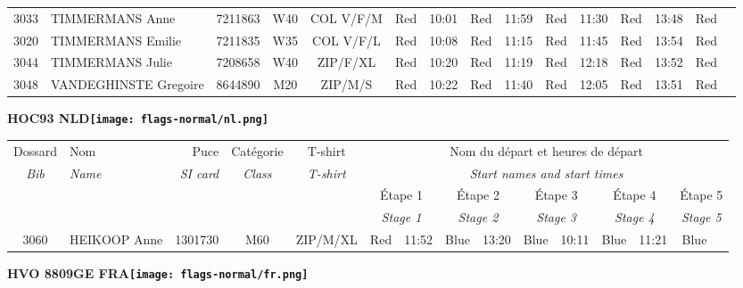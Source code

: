 \documentclass{report}
\begin{document}
\begin{longtable}{|c|l|r|c|c|*{5}{cc|}}
    3033 & TIMMERMANS Anne & 7211863 & W40 & COL V/F/M & Red & 10:01 & Red & 11:59 & Red & 11:30 & Red & 13:48 & Red &  \\
    3020 & TIMMERMANS Emilie & 7211835 & W35 & COL V/F/L & Red & 10:08 & Red & 11:15 & Red & 11:45 & Red & 13:54 & Red &  \\
    3044 & TIMMERMANS Julie & 7208658 & W40 & ZIP/F/XL & Red & 10:20 & Red & 11:19 & Red & 12:18 & Red & 13:52 & Red &  \\
    3048 & VANDEGHINSTE Gregoire & 8644890 & M20 & ZIP/M/S & Red & 10:22 & Red & 11:40 & Red & 12:05 & Red & 13:51 & Red &  \\
  \end{longtable}
\newpage
  \Huge \centering \bfseries HOC93  NLD\normalfont \footnotesize \sffamily \hfill \texttt{[image: flags-normal/nl.png]} \newline 
  \begin{longtable}{|c|l|r|c|c|*{5}{cc|}}
    Dossard & Nom  & Puce    & Catégorie & T-shirt & \multicolumn{10}{c|}{Nom du départ et heures de départ} \\
    \itshape Bib     & \itshape Name & \itshape SI card & \itshape Class  & \itshape  T-shirt  & \multicolumn{10}{c|}{\itshape Start names and start times} \\
    \hline
    & & & & & \multicolumn{2}{c|}{Étape 1} & \multicolumn{2}{c|}{Étape 2} & \multicolumn{2}{c|}{Étape 3} & \multicolumn{2}{c|}{Étape 4} & \multicolumn{2}{c|}{Étape 5} \\
    & & & & & \multicolumn{2}{c|}{\itshape Stage 1} & \multicolumn{2}{c|}{\itshape Stage 2} & \multicolumn{2}{c|}{\itshape Stage 3} & \multicolumn{2}{c|}{\itshape Stage 4} & \multicolumn{2}{c|}{\itshape Stage 5} \\
    \hline
    3060 & HEIKOOP Anne & 1301730 & M60 & ZIP/M/XL & Red & 11:52 & Blue & 13:20 & Blue & 10:11 & Blue & 11:21 & Blue &  \\
  \end{longtable}
\newpage
  \Huge \centering \bfseries HVO 8809GE FRA\normalfont \footnotesize \sffamily \hfill \texttt{[image: flags-normal/fr.png]} \newline 
\end{document}
